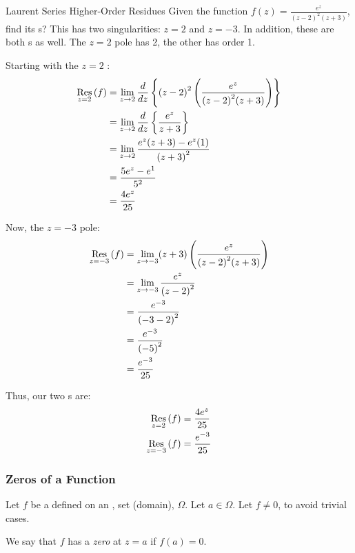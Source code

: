 \begin{example}{Laurent Series Higher-Order Residues}
  Given the function $f(z) = \frac{e^{z}}{{(z-2)}^{2} (z+3)}$, find its s?
  \tcblower{}
  This has two singularities: $z=2$ and $z=-3$.
  In addition, these are both s as well.
  The $z=2$ pole has  2, the other has order 1.

  Starting with the $z=2$ :
  \begin{align*}
    \Residue{f}{z=2} &= \lim\limits_{z \to 2} \frac{d}{dz} \left\lbrace {(z-2)}^{2} \left( \frac{e^{z}}{{(z-2)}^{2} (z+3)} \right) \right\rbrace \\
                     &= \lim\limits_{z \to 2} \frac{d}{dz} \left\lbrace \frac{e^{z}}{z+3} \right\rbrace \\
                     &= \lim\limits_{z \to 2} \frac{e^{z}(z+3) - e^{z} (1)}{{(z+3)}^{2}} \\
                     &= \frac{5e^{z} - e^{1}}{5^{2}} \\
                     &= \frac{4e^{z}}{25}
  \end{align*}

  Now, the $z=-3$ pole:
  \begin{align*}
    \Residue{f}{z=-3} &= \lim\limits_{z \to -3} (z+3) \left( \frac{e^{z}}{{(z-2)}^{2} (z+3)} \right) \\
                      &= \lim\limits_{z \to -3} \frac{e^{z}}{{(z-2)}^{2}} \\
                      &= \frac{e^{-3}}{{(-3 - 2)}^{2}} \\
                      &= \frac{e^{-3}}{{(-5)}^{2}} \\
                      &= \frac{e^{-3}}{25}
  \end{align*}

  Thus, our two s are:
  \begin{align*}
    \Residue{f}{z=2} &= \frac{4e^{z}}{25} \\
    \Residue{f}{z=-3} &= \frac{e^{-3}}{25}
  \end{align*}
\end{example}

\subsubsection{Zeros of a Function}\label{subsubsec:Zeros_of_Functions}
\begin{definition}[Zero]\label{def:Zero}
  Let $f$ be a  defined on an ,  set (domain), $\Omega$.
  Let $a \in \Omega$.
  Let $f \neq 0$, to avoid trivial cases.

  We say that $f$ has a \emph{zero} at $z=a$ if $f(a) = 0$.
\end{definition}

